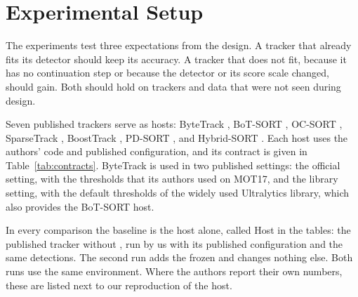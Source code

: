 \section{Experimental Setup}\label{sec:setup}

The experiments test three expectations from the design. A tracker that
already fits its detector should keep its accuracy. A tracker that does not
fit, because it has no continuation step or because the detector or its
score scale changed, should gain. Both should hold on trackers and data that
were not seen during design.

\label{sec:hosts}Seven published trackers serve as hosts: ByteTrack
\cite{zhang2022bytetrack}, BoT-SORT \cite{aharon2022botsort}, OC-SORT
\cite{cao2023ocsort}, SparseTrack \cite{liu2025sparsetrack}, BoostTrack
\cite{stanojevic2024boosttrack}, PD-SORT \cite{wang2025pdsort}, and
Hybrid-SORT \cite{yang2024hybridsort}. Each host uses the authors' code and
published configuration, and its contract is given in
Table~\ref{tab:contracts}. ByteTrack is used in two published settings: the
official setting, with the thresholds that its authors used on MOT17, and the
library setting, with the default thresholds of the widely used Ultralytics
library, which also provides the BoT-SORT host.

In every comparison the baseline is the host alone, called Host in the
tables: the published tracker without \scl{}, run by us with its published
configuration and the same detections. The
second run adds the frozen \scl{} and changes nothing else. Both runs use the
same environment. Where the authors report their own numbers, these are
listed next to our reproduction of the host.
